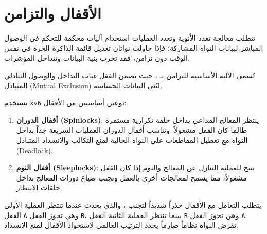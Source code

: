 \chapter{الأقفال والتزامن}
\label{chap:lock}

تتطلب معالجة تعدد الأنوية وتعدد العمليات استخدام آليات محكمة للتحكم في الوصول المباشر لبيانات النواة المشاركة؛
فإذا حاولت نواتان تعديل قائمة الذاكرة الحرة في نفس الوقت دون تزامن، فقد تخرب بنية البيانات وتتداخل المؤشرات.

تُسمى الآلية الأساسية للتزامن بـ ، حيث يضمن القفل غياب التداخل والوصول التبادلي المتبادل (Mutual Exclusion) لبُنى البيانات الحساسة.

تستخدم \texttt{xv6} نوعين أساسيين من الأقفال:
\begin{enumerate}
\item \textbf{أقفال الدوران (Spinlocks)}: ينتظر المعالج المداعي بداخل حلقة تكرارية مستمرة طالما كان القفل مشغولاً. وتناسب أقفال الدوران العمليات السريعة جداً بداخل النواة مع تعطيل المقاطعات على النواة الحالية لمنع التكالب والانسداد المتبادل (Deadlock).
\item \textbf{أقفال النوم (Sleeplocks)}: تتيح للعملية التنازل عن المعالج والنوم إذا كان القفل مشغولاً، مما يسمح لمعالجات أخرى بالعمل وتجنب ضياع دورات المعالج بداخل حلقات الانتظار.
\end{enumerate}

يتطلب التعامل مع الأقفال حذراً شديداً لتجنب ،
والذي يحدث عندما تنتظر العملية الأولى القفل \texttt{A} وهي تحوز القفل \texttt{B}، بينما تنتظر العملية الثانية القفل \texttt{B} وهي تحوز القفل \texttt{A}.
تفرض النواة نظاماً صارماً يحدد الترتيب العالمي لاستحواذ الأقفال لمنع الانسداد.
